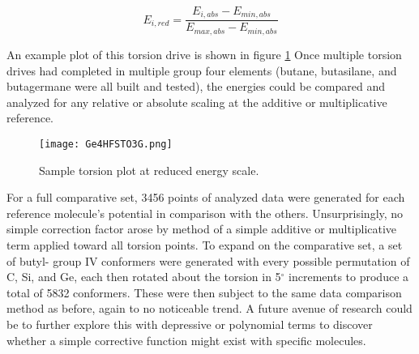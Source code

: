 \begin{equation}
E_{i, red} = \frac{E_{i,abs} - E_{min,abs}}{E_{max,abs}-E_{min,abs}}
\label{eq:TorsionReducedScale}
\end{equation}

An example plot of this torsion drive is shown in figure \ref{fig:EXTorsion} Once multiple torsion drives had completed in multiple group four elements (butane, butasilane, and butagermane were all built and tested), the energies could be compared and analyzed for any relative or absolute scaling at the additive or multiplicative reference. 

\begin{figure}
	
	\centering
	
	\texttt{[image: Ge4HFSTO3G.png]}
	
	\caption{Sample torsion plot at reduced energy scale.}
	
	\label{fig:EXTorsion}
	
\end{figure}

For a full comparative set, 3456 points of analyzed data were generated for each reference molecule's potential in comparison with the others. 
Unsurprisingly, no simple correction factor arose by method of a simple additive or multiplicative term applied toward all torsion points. 
To expand on the comparative set, a set of butyl- group IV conformers were generated with every possible permutation of C, Si, and Ge, each then rotated about the torsion in 5$^{\circ}$ increments to produce a total of 5832 conformers.
These were then subject to the same data comparison method as before, again to no noticeable trend.
A future avenue of research could be to further explore this with depressive or polynomial terms to discover whether a simple corrective function might exist with specific molecules.

